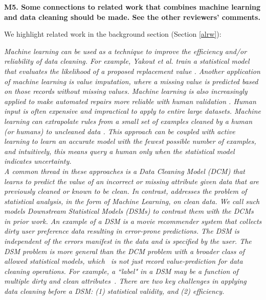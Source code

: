 \vspace{0.5em}

\noindent\textbf{M5. Some connections to related work that combines machine learning and data cleaning should be made. See the other reviewers' comments.}

We highlight related work in the background section (Section \ref{alrw}):

\emph{Machine learning can be used as a technique to improve the efficiency and/or reliability of data cleaning\cite{yakout2013don,gokhale2014corleone}.
For example, Yakout et al. train a statistical model that evaluates the likelihood of a proposed replacement value \cite{yakout2013don}.
Another application of machine learning is value imputation, where a missing value is predicted based on those records without missing values.
Machine learning is also increasingly applied to make automated repairs more reliable with human validation \cite{DBLP:journals/pvldb/YakoutENOI11}.
Human input is often expensive and impractical to apply to entire large datasets.
Machine learning can extrapolate rules from a small set of examples cleaned by a human (or humans) to uncleaned data \cite{gokhale2014corleone, DBLP:journals/pvldb/YakoutENOI11}.
This approach can be coupled with active learning \cite{DBLP:journals/pvldb/MozafariSFJM14} to learn an accurate model with the fewest possible number of examples, and intuitively, this means
query a human only when the statistical model indicates uncertainty.\\
A common thread in these approaches is a Data Cleaning Model (DCM) that learns to predict the value of an incorrect or missing attribute given data that are previously cleaned or known to be clean.
In contrast, \sys addresses the problem of statistical analysis, in the form of Machine Learning, on clean data.
We call such models Downstream Statistical Models (DSMs) to contrast them with the DCMs in prior work.
An example of a DSM is a movie recommender system that collects dirty user preference data resulting in error-prone predictions.
The DSM is independent of the errors manifest in the data and is specified by the user.
The DSM problem is more general than the DCM problem with a broader class of allowed statistical models, which~ is not just record value-prediction for data cleaning operations.
For example, a ``label" in a DSM may be a function of multiple dirty and clean attributes~.
There are two key challenges in applying data cleaning before a DSM: (1) statistical validity, and (2) efficiency. 
}
